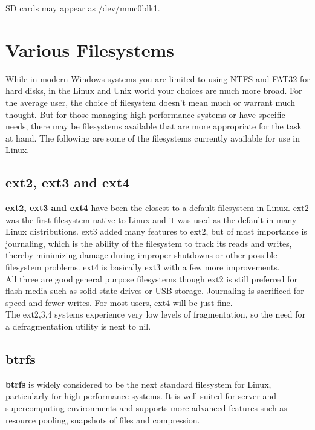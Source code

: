 SD cards may appear as /dev/mmc0blk1.

\section{Various Filesystems}

While in modern Windows systems you are limited to using NTFS and FAT32 for hard disks, in the Linux and Unix world your choices are much more broad.  For the average user, the choice of filesystem doesn't mean much or warrant much thought.  But for those managing high performance systems or have specific needs, there may be filesystems available that are more appropriate for the task at hand.  The following are some of the filesystems currently available for use in Linux.

\subsection{ext2, ext3 and ext4}

\textbf{ext2, ext3 and ext4} have been the closest to a default filesystem in Linux.  ext2 was the first filesystem native to Linux and it was used as the default in many Linux distributions.  ext3 added many features to ext2, but of most importance is journaling, which is the ability of the filesystem to track its reads and writes, thereby minimizing damage during improper shutdowns or other possible filesystem problems.  ext4 is basically ext3 with a few more improvements.\\

All three are good general purpose filesystems though ext2 is still preferred for flash media such as solid state drives or USB storage.  Journaling is sacrificed for speed and fewer writes.  For most users, ext4 will be just fine.\\

The ext2,3,4 systems experience very low levels of fragmentation, so the need for a defragmentation utility is next to nil.

\subsection{btrfs}

\textbf{btrfs} is widely considered to be the next standard filesystem for Linux, particularly for high performance systems.  It is well suited for server and supercomputing environments and supports more advanced features such as resource pooling, snapshots of files and compression.

